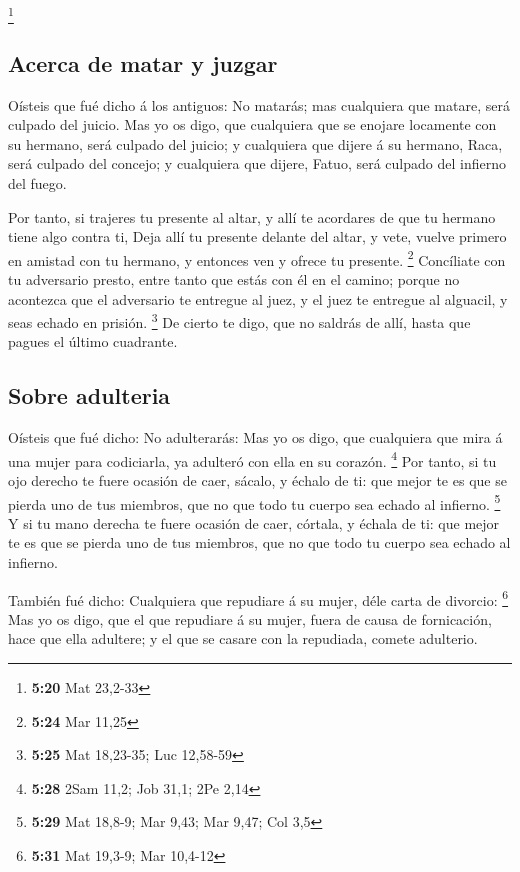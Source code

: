 \footnote{\textbf{5:20} Mat 23,2-33}

\hypertarget{acerca-de-matar-y-juzgar}{%
\subsection{Acerca de matar y juzgar}\label{acerca-de-matar-y-juzgar}}

 Oísteis que fué dicho á los antiguos: No matarás; mas
cualquiera que matare, será culpado del juicio.  Mas yo
os digo, que cualquiera que se enojare locamente con su hermano, será
culpado del juicio; y cualquiera que dijere á su hermano, Raca, será
culpado del concejo; y cualquiera que dijere, Fatuo, será culpado del
infierno del fuego.

 Por tanto, si trajeres tu presente al altar, y allí te
acordares de que tu hermano tiene algo contra ti,  Deja
allí tu presente delante del altar, y vete, vuelve primero en amistad
con tu hermano, y entonces ven y ofrece tu presente. \footnote{\textbf{5:24}
  Mar 11,25}  Concíliate con tu adversario presto, entre
tanto que estás con él en el camino; porque no acontezca que el
adversario te entregue al juez, y el juez te entregue al alguacil, y
seas echado en prisión. \footnote{\textbf{5:25} Mat 18,23-35; Luc
  12,58-59}  De cierto te digo, que no saldrás de allí,
hasta que pagues el último cuadrante.

\hypertarget{sobre-adulteria}{%
\subsection{Sobre adulteria}\label{sobre-adulteria}}

 Oísteis que fué dicho: No adulterarás: 
Mas yo os digo, que cualquiera que mira á una mujer para codiciarla, ya
adulteró con ella en su corazón. \footnote{\textbf{5:28} 2Sam 11,2; Job
  31,1; 2Pe 2,14}  Por tanto, si tu ojo derecho te fuere
ocasión de caer, sácalo, y échalo de ti: que mejor te es que se pierda
uno de tus miembros, que no que todo tu cuerpo sea echado al infierno.
\footnote{\textbf{5:29} Mat 18,8-9; Mar 9,43; Mar 9,47; Col 3,5}
 Y si tu mano derecha te fuere ocasión de caer, córtala,
y échala de ti: que mejor te es que se pierda uno de tus miembros, que
no que todo tu cuerpo sea echado al infierno.

 También fué dicho: Cualquiera que repudiare á su mujer,
déle carta de divorcio: \footnote{\textbf{5:31} Mat 19,3-9; Mar 10,4-12}
 Mas yo os digo, que el que repudiare á su mujer, fuera
de causa de fornicación, hace que ella adultere; y el que se casare con
la repudiada, comete adulterio.

